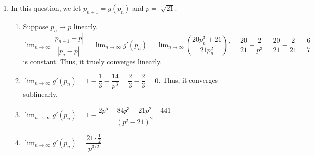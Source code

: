 \documentclass[12pt]{article}
\begin{document}
\begin{enumerate}
    \item In this question, we let $p_{n+1} = g(p_n)$ and $p = \sqrt[3]{21}$.
    
    \begin{enumerate}
        \item Suppose $p_n\to p$ linearly. 
        $\displaystyle\lim_{n\to\infty} \dfrac{|p_{n+1} - p|}{|p_n - p|} = \displaystyle\lim_{n\to\infty} g'(p_n) = \displaystyle\lim_{n\to\infty} (\dfrac{20p_n^3 + 21}{21p_n^2})' = \dfrac{20}{21} - \dfrac{2}{p^3} = \dfrac{20}{21} - \dfrac{2}{21} = \dfrac{6}{7}$ is constant.
        Thus, it truely converges linearly.

        \item $\displaystyle\lim_{n\to\infty} g'(p_n) = 1 - \dfrac{1}{3} - \dfrac{14}{p^3} = \dfrac{2}{3} - \dfrac{2}{3} = 0$.
        Thus, it converges sublinearly.

        \item $\displaystyle\lim_{n\to\infty} g'(p_n) = 1 - \dfrac{2p^5 - 84p^3 + 21p^2 + 441}{(p^2-21)^2}$

        \item $\displaystyle\lim_{n\to\infty} g'(p_n) = \dfrac{21\cdot \frac{1}{2}}{p^{3/2}}$
    \end{enumerate}
\end{enumerate}
\end{document}
